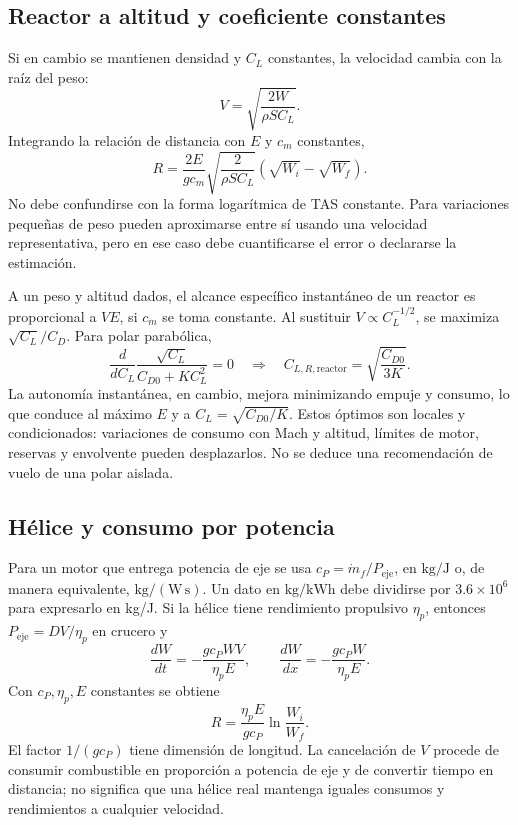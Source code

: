 \subsection{Reactor a altitud y coeficiente constantes}
Si en cambio se mantienen densidad y $C_L$ constantes, la velocidad cambia con la raíz del peso:
\begin{equation}
 V=\sqrt{\frac{2W}{\rho S C_L}}.
\end{equation}
Integrando la relación de distancia con $E$ y $c_m$ constantes,
\begin{equation}\label{eq:11-rangejetH}
 R=\frac{2E}{gc_m}\sqrt{\frac{2}{\rho SC_L}}
 (\sqrt{W_i}-\sqrt{W_f}).
\end{equation}
No debe confundirse con la forma logarítmica de TAS constante. Para variaciones pequeñas de peso pueden aproximarse entre sí usando una velocidad representativa, pero en ese caso debe cuantificarse el error o declararse la estimación.

A un peso y altitud dados, el alcance específico instantáneo de un reactor es proporcional a $VE$, si $c_m$ se toma constante. Al sustituir $V\propto C_L^{-1/2}$, se maximiza $\sqrt{C_L}/C_D$. Para polar parabólica,
\begin{equation}
 \frac{d}{dC_L}\frac{\sqrt{C_L}}{C_{D0}+KC_L^2}=0
 \quad\Longrightarrow\quad C_{L,R,\mathrm{reactor}}=
 \sqrt{\frac{C_{D0}}{3K}}.
\end{equation}
La autonomía instantánea, en cambio, mejora minimizando empuje y consumo, lo que conduce al máximo $E$ y a $C_L=\sqrt{C_{D0}/K}$. Estos óptimos son locales y condicionados: variaciones de consumo con Mach y altitud, límites de motor, reservas y envolvente pueden desplazarlos. No se deduce una recomendación de vuelo de una polar aislada.

\subsection{Hélice y consumo por potencia}
Para un motor que entrega potencia de eje se usa $c_P=\dot m_f/P_{\mathrm{eje}}$, en $\mathrm{kg/J}$ o, de manera equivalente, $\mathrm{kg/(W\,s)}$. Un dato en $\mathrm{kg/kWh}$ debe dividirse por $3.6\times10^6$ para expresarlo en kg/J. Si la hélice tiene rendimiento propulsivo $\eta_p$, entonces $P_{\mathrm{eje}}=DV/\eta_p$ en crucero y
\begin{equation}
 \frac{dW}{dt}=-\frac{gc_PWV}{\eta_p E},\qquad
 \frac{dW}{dx}=-\frac{gc_PW}{\eta_p E}.
\end{equation}
Con $c_P,\eta_p,E$ constantes se obtiene
\begin{equation}\label{eq:11-rangeprop}
 R=\frac{\eta_p E}{gc_P}\ln\frac{W_i}{W_f}.
\end{equation}
El factor $1/(gc_P)$ tiene dimensión de longitud. La cancelación de $V$ procede de consumir combustible en proporción a potencia de eje y de convertir tiempo en distancia; no significa que una hélice real mantenga iguales consumos y rendimientos a cualquier velocidad.

